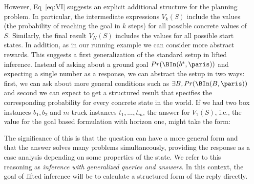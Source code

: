 %
%
However, Eq~\ref{eq:VI} suggests an explicit additional structure for
the planning problem. In particular, the intermediate expressions $V_k(S)$
include the values (the probability of reaching the goal in $k$ steps)
for all possible concrete values of $S$. Similarly, the final result
$V_N(S)$ includes the values for all possible start states. In addition, as in our running example we can consider more abstract rewards.
This suggests a
first generalization of the standard setup in lifted
inference. Instead of asking about a ground goal $Pr(\BIn(b^*,\paris))$ and expecting a single number as a response, we can abstract the setup in two ways: first, we can ask about
more general conditions such as $\exists B, Pr(\BIn(B,\paris))$ and second we can expect to get a structured result that specifies the
corresponding probability for every concrete state in the world.
%
%
%
If we had two box instances $b_1,b_2$ and $m$ truck instances $t_1,\ldots,t_m$, the answer for $V_1(S)$, i.e., the value for the goal based formulation with horizon one, might take the form:
\begin{center}
\vspace{-4mm}
%
%
%
%
%
%
%
%
%
%
%
\end{center}
%
%
%
The significance of this is that the question can have a more general form and that the answer solves many problems simultaneously, providing the response as a case analysis depending on some properties of the state. 
We refer to this reasoning as {\em inference with
generalized queries and answers}.  In this context, the goal of lifted inference will
be to calculate a structured form of the reply directly. 

